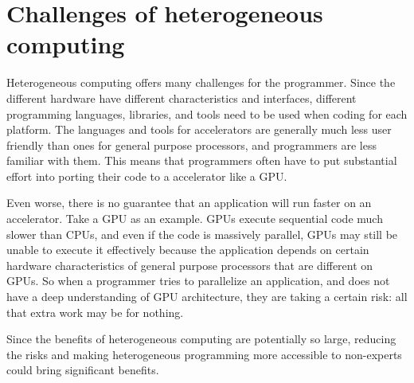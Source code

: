 \documentclass[12pt,twoside]{reedthesis}
\begin{document}
	\section{Challenges of heterogeneous computing}
	
		Heterogeneous computing offers many challenges for the programmer. Since the different hardware have different characteristics and interfaces, different programming languages, libraries, and tools need to be used when coding for each platform. The languages and tools for accelerators are generally much less user friendly than ones for general purpose processors, and programmers are less familiar with them. %
		This means that programmers often have to put substantial effort into porting their code to a accelerator like a GPU.
		
		
		Even worse, there is no guarantee that an application will run faster on an accelerator. Take a GPU as an example. GPUs execute sequential code much slower than CPUs, and even if the code is massively parallel, GPUs may still be unable to execute it effectively because the application depends on certain hardware characteristics of general purpose processors that are different on GPUs. %
		So when a programmer tries to parallelize an application, and does not have a deep understanding of GPU architecture, they are taking a certain risk: all that extra work may be for nothing. 
		
		Since the benefits of heterogeneous computing are potentially so large, reducing the risks and making heterogeneous programming more accessible to non-experts could bring significant benefits.
		
		
		
\end{document}
